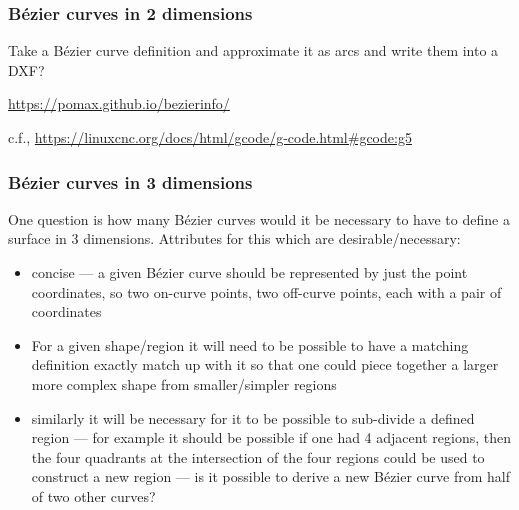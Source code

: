 \documentclass{ltxdoc}
\begin{document}
\subsubsection{Bézier curves in 2 dimensions}

Take a Bézier curve definition and approximate it as arcs and write them into a DXF?

\url{https://pomax.github.io/bezierinfo/}

c.f., \url{https://linuxcnc.org/docs/html/gcode/g-code.html#gcode:g5}

%
%
%
%
%
%
%
%

\subsubsection{Bézier curves in 3 dimensions}
 
One question is how many Bézier curves would it be necessary to have to define a surface
in 3 dimensions. Attributes for this which are desirable/necessary:

\begin{itemize}
\item concise --- a given Bézier curve should be represented by just the point coordinates, 
      so two on-curve points, two off-curve points, each with a pair of coordinates
\item For a given shape/region it will need to be possible to have a matching definition 
      exactly match up with it so that one could piece together a larger more complex shape 
      from smaller/simpler regions
\item similarly it will be necessary for it to be possible to sub-divide a defined region --- 
      for example it should be possible if one had 4 adjacent regions, then the four quadrants 
      at the intersection of the four regions could be used to construct a new region --- is it
      possible to derive a new Bézier curve from half of two other curves?
\end{itemize}
\end{document}
